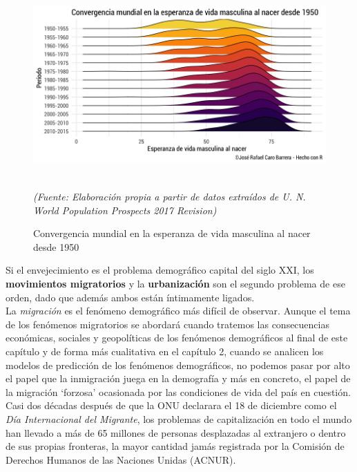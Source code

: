 \newpage

\begin{figure}[!ht]
\centering
\includegraphics[scale=0.45]{Cap1/convergencia.png}
\caption{Convergencia mundial en la esperanza de vida masculina al nacer desde 1950}\\
\textit{(Fuente: Elaboraci\'on propia a partir de datos extra\'idos de U. N. World Population Prospects 2017 Revision)}
\end{figure}

Si el envejecimiento es el problema demogr\'afico capital del siglo XXI, los \textbf{movimientos migratorios} y la \textbf{urbanizaci\'on} son el segundo problema de ese orden, dado que adem\'as ambos est\'an \'intimamente ligados.\\ 

\vspace{-0.2cm}
La \textit{migraci\'on} es el fen\'omeno demogr\'afico m\'as dif\'icil de observar. Aunque el tema de los fen\'omenos migratorios se abordar\'a cuando tratemos las consecuencias econ\'omicas, sociales y geopol\'iticas de los fen\'omenos demogr\'aficos al final de este cap\'itulo y de forma m\'as cualitativa en el cap\'itulo 2, cuando se analicen los modelos de predicci\'on de los fen\'omenos demogr\'aficos, no podemos pasar por alto el papel que la inmigraci\'on juega en la demograf\'ia y m\'as en concreto, el papel de la migraci\'on `forzosa' ocasionada por las condiciones de vida del pa\'is en cuesti\'on.\\ 

\vspace{-0.2cm}
Casi dos d\'ecadas despu\'es de que la ONU declarara el 18 de diciembre como el \textit{D\'ia Internacional del Migrante}, los problemas de capitalizaci\'on en todo el mundo han llevado a m\'as de 65 millones de personas desplazadas al extranjero o dentro de sus propias fronteras, la mayor cantidad jam\'as registrada por la Comisi\'on de Derechos Humanos de las Naciones Unidas (ACNUR).\\ 

